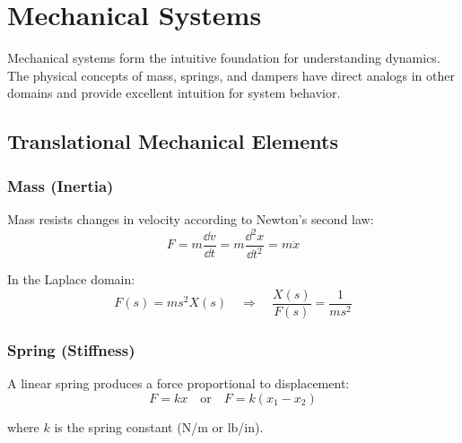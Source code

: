 
\chapter{Mechanical Systems}
\label{ch:mechanical}

Mechanical systems form the intuitive foundation for understanding dynamics. The physical concepts of mass, springs, and dampers have direct analogs in other domains and provide excellent intuition for system behavior.

\section{Translational Mechanical Elements}
\label{sec:trans_elements}

\subsection{Mass (Inertia)}

Mass resists changes in velocity according to Newton's second law:
\begin{equation}
F = m\frac{\dd v}{\dd t} = m\frac{\dd^2 x}{\dd t^2} = m\ddot{x}
\end{equation}



In the Laplace domain:
\begin{equation}
F(s) = ms^2 X(s) \quad \Rightarrow \quad \frac{X(s)}{F(s)} = \frac{1}{ms^2}
\end{equation}

\subsection{Spring (Stiffness)}

A linear spring produces a force proportional to displacement:
\begin{equation}
F = kx \quad \text{or} \quad F = k(x_1 - x_2)
\end{equation}

where $k$ is the spring constant (N/m or lb/in).

